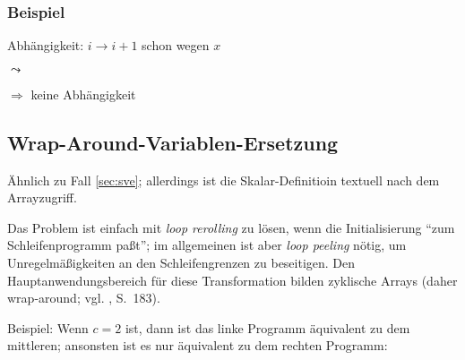 \subsubsection{Beispiel}

\begin{procedure}[H]
\SetLine
{}
\end{procedure}
Abhängigkeit: $i \rightarrow i+1$ schon wegen $x$

$\leadsto$

\begin{procedure}[H]
\SetLine
{}
\end{procedure}

$\Rightarrow$ keine Abhängigkeit
\newpage
\subsection{Wrap-Around-Variablen-Ersetzung}
\label{sec:wave}

Ähnlich zu Fall \ref{sec:sve}; allerdings ist die Skalar-Definitioin
textuell nach dem Arrayzugriff. 

Das Problem ist einfach mit \emph{loop rerolling} zu lösen, wenn die
Initialisierung ``zum Schleifenprogramm paßt''; im allgemeinen ist aber
\emph{loop peeling} nötig, um Unregelmäßigkeiten an den Schleifengrenzen
zu beseitigen. Den Hauptanwendungsbereich für diese Transformation
bilden zyklische Arrays (daher wrap-around; vgl. \cite{Zima90}, S.~183).

Beispiel: Wenn $c=2$ ist, dann ist das linke Programm  äquivalent zu dem
mittleren; ansonsten ist es nur äquivalent zu dem rechten Programm:\\

